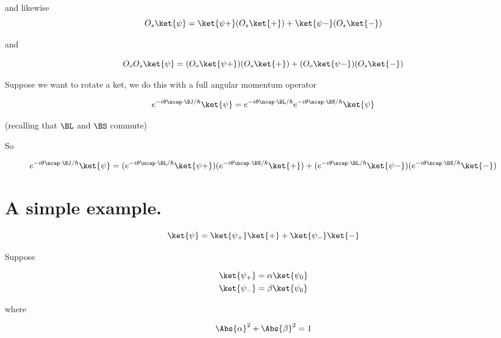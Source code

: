 and likewise
\begin{equation}\label{eqn:qmTwoL14:70}
O_s \ket{\psi} = 
\ket{\psi+} (O_s \ket{+})
+
\ket{\psi-} (O_s \ket{-})
\end{equation}

and

\begin{equation}\label{eqn:qmTwoL14:90}
O_o O_s \ket{\psi} = 
(O_o \ket{\psi+}) (O_s \ket{+})
+
(O_o \ket{\psi-}) (O_s \ket{-})
\end{equation}

Suppose we want to rotate a ket, we do this with a full angular momentum operator

\begin{equation}\label{eqn:qmTwoL14:110}
e^{-i \theta \ncap \cdot \BJ/\hbar} \ket{\psi}
=
e^{-i \theta \ncap \cdot \BL/\hbar} 
e^{-i \theta \ncap \cdot \BS/\hbar} 
\ket{\psi}
\end{equation}

(recalling that $\BL$ and $\BS$ commute)

So

\begin{equation}\label{eqn:qmTwoL14:130}
e^{-i \theta \ncap \cdot \BJ/\hbar} \ket{\psi}
=
(e^{-i \theta \ncap \cdot \BL/\hbar} \ket{\psi+}) (e^{-i \theta \ncap \cdot \BS/\hbar} \ket{+})
+
(e^{-i \theta \ncap \cdot \BL/\hbar} \ket{\psi-}) (e^{-i \theta \ncap \cdot \BS/\hbar} \ket{-})
\end{equation}

\section{A simple example.}

\begin{equation}\label{eqn:qmTwoL14:n}
\ket{\psi} = 
\ket{\psi_+} \ket{+}
+
\ket{\psi_-} \ket{-}
\end{equation}

Suppose 

\begin{align}\label{eqn:qmTwoL14:n}
\ket{\psi_+} &= \alpha \ket{\psi_0} \\
\ket{\psi_-} &= \beta \ket{\psi_0}
\end{align}

where 

\begin{equation}\label{eqn:qmTwoL14:n}
\Abs{\alpha}^2 + \Abs{\beta}^2 = 1
\end{equation}

